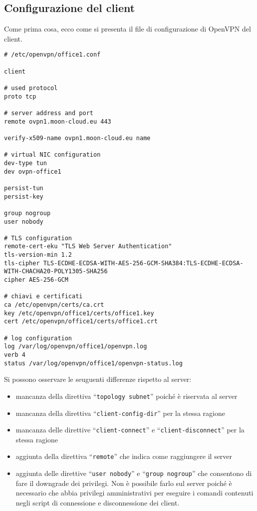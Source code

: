 \subsection{Configurazione del client}
Come prima cosa, ecco come si presenta il file di configurazione di OpenVPN
del client.
\begin{verbatim}
# /etc/openvpn/office1.conf

client

# used protocol
proto tcp

# server address and port
remote ovpn1.moon-cloud.eu 443

verify-x509-name ovpn1.moon-cloud.eu name

# virtual NIC configuration
dev-type tun
dev ovpn-office1

persist-tun
persist-key

group nogroup
user nobody

# TLS configuration
remote-cert-eku "TLS Web Server Authentication"
tls-version-min 1.2
tls-cipher TLS-ECDHE-ECDSA-WITH-AES-256-GCM-SHA384:TLS-ECDHE-ECDSA-WITH-CHACHA20-POLY1305-SHA256
cipher AES-256-GCM

# chiavi e certificati
ca /etc/openvpn/certs/ca.crt
key /etc/openvpn/office1/certs/office1.key
cert /etc/openvpn/office1/certs/office1.crt

# log configuration
log /var/log/openvpn/office1/openvpn.log
verb 4
status /var/log/openvpn/office1/openvpn-status.log
\end{verbatim}
Si possono osservare le seuguenti differenze rispetto al server:
\begin{itemize}
  \item mancanza della direttiva ``\texttt{topology subnet}'' poiché è
  riservata al server
  \item mancanza della direttiva ``\texttt{client-config-dir}'' per la stessa
  ragione
  \item mancanza delle direttive ``\texttt{client-connect}'' e
  ``\texttt{client-disconnect}'' per la stessa ragione
  \item aggiunta della direttiva ``\texttt{remote}'' che indica come raggiungere
  il server
  \item aggiunta delle direttive ``\texttt{user nobody}'' e ``\texttt{group nogroup}''
  che consentono di fare il downgrade dei privilegi. Non è possibile farlo sul
  server poiché è necessario che abbia privilegi amministrativi per eseguire i
  comandi contenuti negli script di connessione e disconnessione dei client.
\end{itemize}
